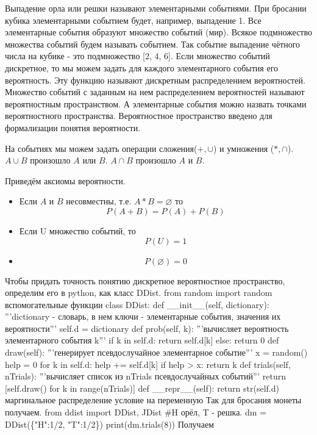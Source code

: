 Выпадение орла или решки называют элементарными событиями. 
При бросании кубика элементарными событием будет, например,
выпадение 1. Все элементарные события образуют множество 
событий (мир). 
Всякое подмножество  множества
событий будем называть событием. 
Так событие выпадение чётного числа на кубике - это 
подмножество [2, 4, 6]. Если множество событий дискретное,
то мы можем задать для каждого элементарного события его 
вероятность. Эту функцию называют дискретным распределением вероятностей.
Множество событий с заданным на нем распределением вероятностей 
называют
вероятностным пространством. А элементарные события можно назвать
точками вероятностного пространства.
Вероятностное пространство введено для формализации понятия вероятности.

На событиях мы можем задать операции 
сложения(\(+, \cup\)) и умножения (\(*,\cap\)).
\(A \cup B\) произошло \(A\) или \(B\).  
\(A \cap B\) произошло \(A\) и \(B\). 

Приведём аксиомы вероятности.
\begin{itemize}
\item Если \(A\) и \(B\) несовместны, т.е.  \(A * B= \varnothing\)
то
        $$ P(A + B) = P(A) + P(B) $$
\item Если U множество событий, то
        $$ P(U) = 1 $$
\item
        $$ P(\varnothing) = 0 $$
\end{itemize}

Чтобы придать точность понятию дискретное вероятностное пространство,
определим его в python, как класс DDist. 
\nwenddocs{}\endmoddef\nwstartdeflinemarkup\nwenddeflinemarkup
from random import random 
\LA{}вспомогательные функции\RA{}
class DDist:
        def __init__(self, dictionary):
                '''dictionary - словарь, в нем 
                ключи - элементарные события, 
                значения их вероятности'''
                self.d = dictionary
        def prob(self, k):
                '''вычисляет вероятность элементарного события k'''
                if k in self.d:
                        return self.d[k]
                else:
                        return 0
        def draw(self):
                '''генерирует псевдослучайное элементарное событие'''
                x = random()
                help = 0
                for k in self.d:
                        help += self.d[k]
                        if help > x:
                                return k
        def trials(self, nTrials):
                '''вычисляет список из nTrials псевдослучайных событий'''
                return [self.draw() for k in range(nTrials)]
        def __repr__(self):
                return str(self.d)
        \LA{}маргинальное распределение\RA{}
        \LA{}условие на переменную\RA{}
\nwendcode{}\nwdocspar
Так для бросания монеты получаем.
\nwenddocs{}\plusendmoddef\nwstartdeflinemarkup\nwenddeflinemarkup
from ddist import DDist, JDist
#H орёл, T - решка.
dm = DDist(\{"H":1/2, "T":1/2\})
print(dm.trials(8))
\nwendcode{}\nwdocspar
Получаем
\nwenddocs{}\moddef{}\plusendmoddef\nwstartdeflinemarkup\nwenddeflinemarkup
['H', 'H', 'H', 'T', 'T', 'T', 'T', 'T']
\nwendcode{}\nwdocspar
